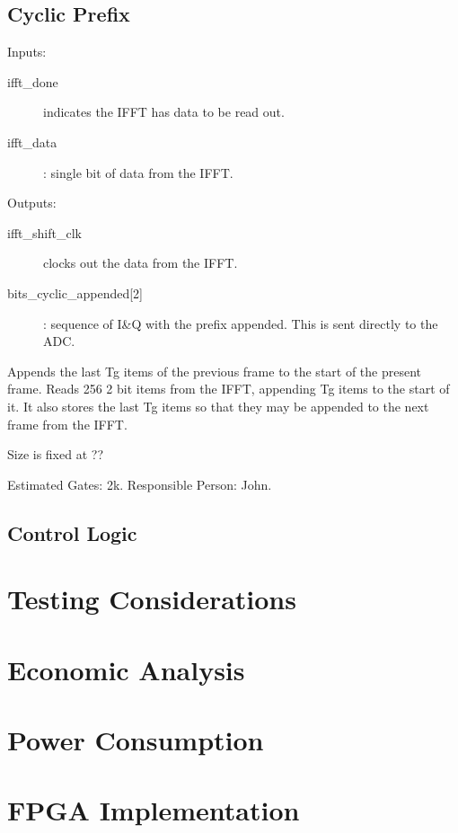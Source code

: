 \documentclass[dvips,10pt,twocolumn]{article}
\begin{document}
	\subsection{Cyclic Prefix}
	\label{sec:cyclic_prefix}
	\begin{description}
		\item{Inputs:}
		\begin{description}
			\item[ifft\_done] indicates the IFFT has
				data to be read out.
			\item[ifft\_data] : single bit of data from
				the IFFT.
		\end{description}
		\item{Outputs:}
		\begin{description}
			\item[ifft\_shift\_clk] clocks out the data from the IFFT.
			\item[bits\_cyclic\_appended{[2]}]: sequence of
				I\&Q with the prefix appended.
				This is sent directly to the ADC.
		\end{description}
	\end{description}

	Appends the last Tg items of the previous frame to the start of the
	present frame.  Reads 256 2 bit items from the IFFT, appending Tg
	items to the start of it. It also stores the last Tg items so that
	they may be appended to the next frame from the IFFT.

	Size is fixed at ??

	Estimated Gates: 2k.
	Responsible Person: John.

	\subsection{Control Logic}
	\label{sec:ctrl}

\section{Testing Considerations}
\section{Economic Analysis}
\section{Power Consumption}
\section{FPGA Implementation}
\end{document}
